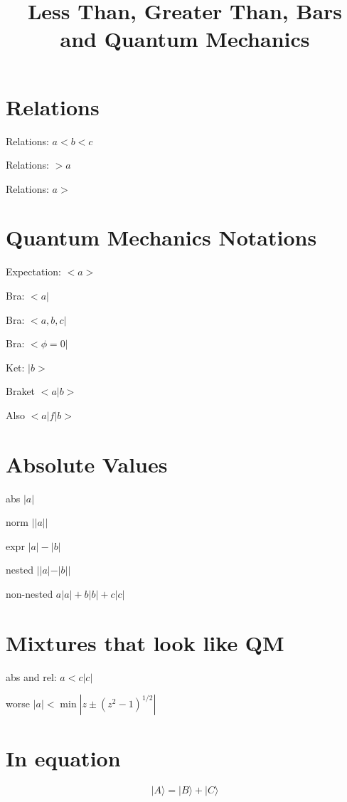 \documentclass{article}
\title{Less Than, Greater Than, Bars and Quantum Mechanics}
\begin{document}
\section{Relations}
Relations: $ a < b < c $

Relations: $ > a $

Relations: $ a > $

\section{Quantum Mechanics Notations}
Expectation: $ <a> $

Bra: $<a|$

Bra: $<a,b,c|$

Bra: $<\phi=0|$

Ket: $|b>$

Braket $<a|b>$

Also $<a|f|b>$

\section{Absolute Values}
abs $|a|$

norm $||a||$

expr $|a|-|b|$

nested $||a|-|b||$

non-nested $a|a|+b|b|+c|c|$

\section{Mixtures that look like QM}

abs and rel: $a<c|c|$

worse $|a|< \min\left|z\pm\left(z^{2}-1\right)^{{1/2}}\right|$

\section{In equation}
\[ |A\rangle = |B\rangle + |C\rangle\]
\end{document}
